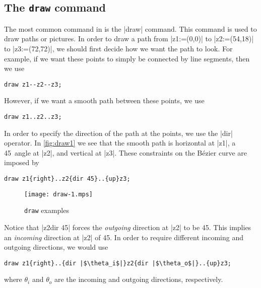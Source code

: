\subsection{The \texttt{draw} command}

The most common command in \MP{} is the |draw| command.  This command is
used to draw paths or pictures.  In order to draw a path from
|z1:=(0,0)| to |z2:=(54,18)| to |z3:=(72,72)|, we should first decide
how we want the path to look.  For example, if we want these points to
simply be connected by line segments, then we use

\begin{lstlisting}[style=MP]
draw z1--z2--z3;
\end{lstlisting}

However, if we want a smooth path between these points, we use

\begin{lstlisting}[style=MP]
draw z1..z2..z3;
\end{lstlisting}

In order to specify the direction of the path at the points, we use the
|dir| operator.  In \autoref{fig:draw1} we see that the smooth path is
horizontal at |z1|, a 45\textdegree\ angle at |z2|, and vertical at
|z3|.  These constraints on the B\'{e}zier curve are imposed by

\begin{lstlisting}[style=MP]
draw z1{right}..z2{dir 45}..{up}z3;
\end{lstlisting}

\begin{figure}
  \centering
  \texttt{[image: draw-1.mps]}
  \caption{\texttt{draw} examples}
  \label{fig:draw1}
\end{figure}

Notice that |z2{dir 45}| forces the \textit{outgoing} direction at |z2|
to be 45\textdegree.  This implies an \textit{incoming} direction at
|z2| of 45\textdegree.  In order to require different incoming and
outgoing directions, we would use

\begin{lstlisting}[style=MP]
draw z1{right}..{dir |$\theta_i$|}z2{dir |$\theta_o$|}..{up}z3;
\end{lstlisting}
where $\theta_i$ and $\theta_o$ are the incoming and outgoing
directions, respectively.
